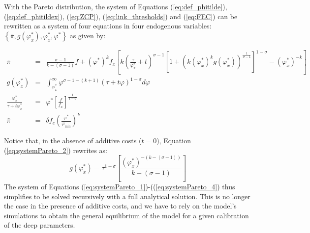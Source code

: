 \documentclass[a4paper,11pt]{article}
\begin{document}
With the Pareto distribution, the system of Equations (\ref{eq:def_phitilde}), (\ref{eq:def_phitildex}), (\ref{eq:ZCP}), (\ref{eq:link_thresholds}) and (\ref{eq:FEC}) can be rewritten as a system of four equations in four endogenous variables: $\left\{\bar{\pi}, g(\varphi_x^\ast),\varphi_x^\ast, \varphi^\ast  \right\}$ as given by:

\begin{eqnarray}
\bar{\pi}&=& \frac{\sigma-1}{k-(\sigma-1)}f + \left(\varphi^\ast \right)^k f_x\left[k\left(\frac{\tau}{\varphi_x^\ast}+t  \right)^{\sigma-1}\left[  1+(k(\varphi_x^\ast)^k g(\varphi_x^\ast))^{\frac{1}{\sigma-1}}\right]^{1-\sigma}  - \left( \varphi_x^\ast \right)^{-k} \right] \label{eq:systemPareto_1}\\
g(\varphi_x^\ast)&=&\int_{\varphi_x^\ast}^\infty \varphi^{\sigma-1-(k+1)}(\tau +t\varphi)^{1-\sigma}d\varphi \label{eq:systemPareto_2} \\
\frac{\varphi_x^\ast}{\tau+ t\varphi_x^\ast}&=&\varphi^\ast \left[ \frac{f}{f_x} \right]^{\frac{1}{1-\sigma}} \label{eq:systemPareto_3}\\
\bar{\pi}&=& \delta f_e \left( \frac{\varphi^\ast}{\varphi_{\text{min}}} \right)^k \label{eq:systemPareto_4}
\end{eqnarray}

Notice that, in the absence of additive costs ($t=0$), Equation (\ref{eq:systemPareto_2}) rewrites as:
$$g(\varphi_x^\ast) = \tau^{1-\sigma}\left[ \frac{(\varphi_x^\ast)^{-(k-(\sigma-1))}}{k-(\sigma-1)}\right]$$
The system of Equations (\ref{eq:systemPareto_1})-((\ref{eq:systemPareto_4}) thus simplifies to be solved recursively with a full analytical solution. This is no longer the case in the presence of additive costs, and we have to rely on the model's simulations to obtain the general equilibrium of the model for a given calibration of the deep parameters.
\end{document}
